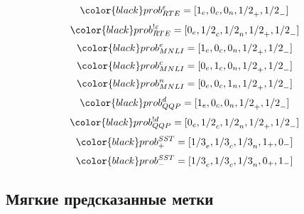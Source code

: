 \begin{equation}
\color{black} prob^{\varepsilon}_{RTE}  = [{1}_{e}, {0}_{c},{0}_{n},{1/2}_{+},{1/2}_{-}]
\label{eq:ps4:0}
\end{equation}
\begin{equation}
\color{black} prob^{!\varepsilon}_{RTE}  = [{0}_{e}, {1/2}_{c},{1/2}_{n},{1/2}_{+},{1/2}_{-}]
\label{eq:ps4:1}
\end{equation}
\begin{equation}
\color{black} prob^{e}_{MNLI}  = [{1}_{e}, {0}_{c},{0}_{n},{1/2}_{+},{1/2}_{-}]
\label{eq:ps4:2}
\end{equation}
\begin{equation}
\color{black} prob^{c}_{MNLI}  = [{0}_{e}, {1}_{c},{0}_{n},{1/2}_{+},{1/2}_{-}]
\label{eq:ps4:3}
\end{equation}
\begin{equation}
\color{black} prob^{n}_{MNLI}  = [{0}_{e}, {0}_{c},{1}_{n},{1/2}_{+},{1/2}_{-}]
\label{eq:ps4:4}
\end{equation}
\begin{equation}
\color{black} prob^{d}_{QQP}  = [{1}_{e}, {0}_{c},{0}_{n},{1/2}_{+},{1/2}_{-}]
\label{eq:ps4:5}
\end{equation}
\begin{equation}
\color{black} prob^{!d}_{QQP}  = [{0}_{e}, {1/2}_{c},{1/2}_{n},{1/2}_{+},{1/2}_{-}]
\label{eq:ps4:6}
\end{equation}
\begin{equation}
\color{black} prob^{SST}_{+} = [{1/3}_{e}, {1/3}_{c},{1/3}_{n},{1}_{+},{0}_{-}]
\label{eq:ps4:7}
\end{equation}
\begin{equation}
\color{black} prob^{SST}_{-} = [{1/3}_{e}, {1/3}_{c},{1/3}_{n},{0}_{+},{1}_{-}]
\label{eq:ps4:8}
\end{equation}

\subsection{Мягкие предсказанные метки}\label{subch:pseudolabel/sect3/sub5}

